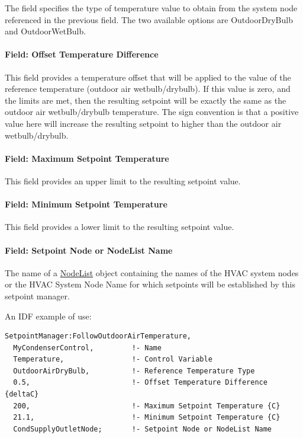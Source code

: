 The field specifies the type of temperature value to obtain from the system node referenced in the previous field. The two available options are OutdoorDryBulb and OutdoorWetBulb.

\paragraph{Field: Offset Temperature Difference}\label{field-offset-temperature-difference}

This field provides a temperature offset that will be applied to the value of the reference temperature (outdoor air wetbulb/drybulb). If this value is zero, and the limits are met, then the resulting setpoint will be exactly the same as the outdoor air wetbulb/drybulb temperature. The sign convention is that a positive value here will increase the resulting setpoint to higher than the outdoor air wetbulb/drybulb.

\paragraph{Field: Maximum Setpoint Temperature}\label{field-maximum-setpoint-temperature-6}

This field provides an upper limit to the resulting setpoint value.

\paragraph{Field: Minimum Setpoint Temperature}\label{field-minimum-setpoint-temperature-6}

This field provides a lower limit to the resulting setpoint value.

\paragraph{Field: Setpoint Node or NodeList Name}\label{field-setpoint-node-or-nodelist-name-19}

The name of a \hyperref[nodelist]{NodeList} object containing the names of the HVAC system nodes or the HVAC System Node Name for which setpoints will be established by this setpoint manager.

An IDF example of use:

\begin{lstlisting}
SetpointManager:FollowOutdoorAirTemperature,
  MyCondenserControl,         !- Name
  Temperature,                !- Control Variable
  OutdoorAirDryBulb,          !- Reference Temperature Type
  0.5,                        !- Offset Temperature Difference {deltaC}
  200,                        !- Maximum Setpoint Temperature {C}
  21.1,                       !- Minimum Setpoint Temperature {C}
  CondSupplyOutletNode;       !- Setpoint Node or NodeList Name
\end{lstlisting}

